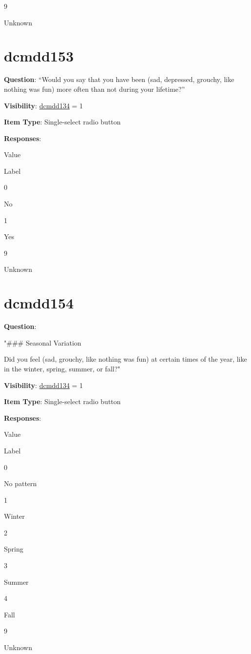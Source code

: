 \documentclass[
]{book}
\begin{document}
9

Unknown

\hypertarget{dcmdd153}{%
\section{dcmdd153}\label{dcmdd153}}

\textbf{Question}: ``Would you say that you have been (sad, depressed, grouchy, like nothing was fun) more often than not during your lifetime?''

\textbf{Visibility}: \protect\hyperlink{dcmdd134}{dcmdd134} = 1

\textbf{Item Type}: Single-select radio button

\textbf{Responses}:

Value

Label

0

No

1

Yes

9

Unknown

\hypertarget{dcmdd154}{%
\section{dcmdd154}\label{dcmdd154}}

\textbf{Question}:

"\#\#\# Seasonal Variation

Did you feel (sad, grouchy, like nothing was fun) at certain times of the year, like in the winter, spring, summer, or fall?"

\textbf{Visibility}: \protect\hyperlink{dcmdd134}{dcmdd134} = 1

\textbf{Item Type}: Single-select radio button

\textbf{Responses}:

Value

Label

0

No pattern

1

Winter

2

Spring

3

Summer

4

Fall

9

Unknown
\end{document}
